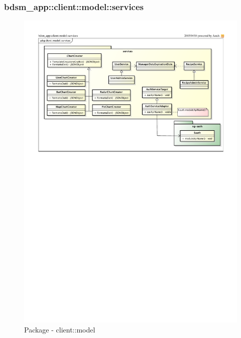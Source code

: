%
%

%

\subsubsection{bdsm\_app::client::model::services} %
\label{ssub:bdsm_app_client_model_services}
\begin{figure}[htbp]
	\centering
	\centerline{\includegraphics[scale=1.03]{./images/client/client_model_services.pdf}}
	\caption{Package - client::model}
\end{figure}

